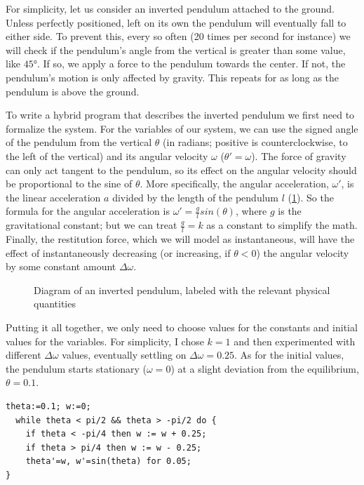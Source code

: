 For simplicity, let us consider an inverted pendulum attached to the ground. Unless perfectly positioned, left on its own the pendulum will eventually fall to either side. To prevent this, every so often (20 times per second for instance) we will check if the pendulum's angle from the vertical is greater than some value, like $45°$. If so, we apply a force to the pendulum towards the center. If not, the pendulum's motion is only affected by gravity. This repeats for as long as the pendulum is above the ground.

To write a hybrid program that describes the inverted pendulum we first need to formalize the system. For the variables of our system, we can use the signed angle of the pendulum from the vertical $\theta$ (in radians; positive is counterclockwise, to the left of the vertical) and its angular velocity $\omega$ ($\theta'=\omega$). The force of gravity can only act tangent to the pendulum, so its effect on the angular velocity should be proportional to the sine of $\theta$. More specifically, the angular acceleration, $\omega'$, is the linear acceleration $a$ divided by the length of the pendulum $l$ (\cref{fig:inverted_pendulum}). So the formula for the angular acceleration is $\omega'=\frac{g}{l}sin(\theta)$, where $g$ is the gravitational constant; but we can treat $\frac{g}{l}=k$ as a constant to simplify the math. Finally, the restitution force, which we will model as instantaneous, will have the effect of instantaneously decreasing (or increasing, if $\theta<0$) the angular velocity by some constant amount $\Delta\omega$.

\begin{figure}
  \centering
  
  \caption{Diagram of an inverted pendulum, labeled with the relevant physical quantities}
  \label{fig:inverted_pendulum}
\end{figure}

Putting it all together, we only need to choose values for the constants and initial values for the variables. For simplicity, I chose $k=1$ and then experimented with different $\Delta\omega$ values, eventually settling on $\Delta\omega=0.25$. As for the initial values, the pendulum starts stationary ($\omega=0$) at a slight deviation from the equilibrium, $\theta=0.1$.

\begin{lstlisting}[caption=Jaguar program that models inverted pendulum balancing with instantaneous restitution]
  theta:=0.1; w:=0;
  while theta < pi/2 && theta > -pi/2 do {
    if theta < -pi/4 then w := w + 0.25;
    if theta > pi/4 then w := w - 0.25;
    theta'=w, w'=sin(theta) for 0.05;
}
\end{lstlisting}

